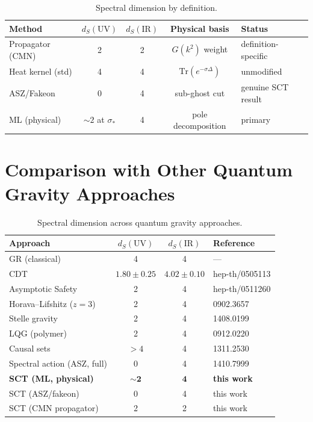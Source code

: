 \documentclass[11pt,a4paper]{article}
\newcommand{\ds}{d_S}
\begin{document}
\begin{table}[h]
\centering
\begin{tabular}{lcccl}
\toprule
Method & $\ds(\mathrm{UV})$ & $\ds(\mathrm{IR})$ & Physical basis & Status \\
\midrule
Propagator (CMN)  & 2 & 2 & $G(k^2)$ weight & definition-specific \\
Heat kernel (std) & 4 & 4 & $\mathrm{Tr}(e^{-\sigma\Delta})$ & unmodified \\
ASZ/Fakeon        & 0 & 4 & sub-ghost cut & genuine SCT result \\
ML (physical)     & $\sim 2$ at $\sigma_*$ & 4 & pole decomposition & primary \\
\bottomrule
\end{tabular}
\caption{Spectral dimension by definition.}
\label{tab:ds-summary}
\end{table}


\section{Comparison with Other Quantum Gravity Approaches}
\label{sec:comparison}

\begin{table}[h]
\centering
\begin{tabular}{lccl}
\toprule
Approach & $\ds(\mathrm{UV})$ & $\ds(\mathrm{IR})$ & Reference \\
\midrule
GR (classical) & 4 & 4 & --- \\
CDT & $1.80 \pm 0.25$ & $4.02 \pm 0.10$ & hep-th/0505113 \\
Asymptotic Safety & 2 & 4 & hep-th/0511260 \\
Horava--Lifshitz ($z=3$) & 2 & 4 & 0902.3657 \\
Stelle gravity & 2 & 4 & 1408.0199 \\
LQG (polymer) & 2 & 4 & 0912.0220 \\
Causal sets & $>4$ & 4 & 1311.2530 \\
Spectral action (ASZ, full) & 0 & 4 & 1410.7999 \\
\textbf{SCT (ML, physical)} & $\boldsymbol{\sim 2}$ & $\mathbf{4}$ & \textbf{this work} \\
SCT (ASZ/fakeon) & 0 & 4 & this work \\
SCT (CMN propagator) & 2 & 2 & this work \\
\bottomrule
\end{tabular}
\caption{Spectral dimension across quantum gravity approaches.}
\label{tab:comparison}
\end{table}
\end{document}
